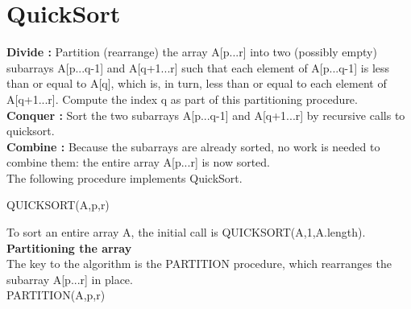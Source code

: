 \section{QuickSort}
\textbf{Divide :} Partition (rearrange) the array A[p...r] into two (possibly empty) subarrays A[p...q-1] and 
A[q+1...r] such that each element of A[p...q-1] is less than or equal to A[q], which is, in turn, less than or equal to each element of A[q+1...r]. Compute the index q as part of this partitioning procedure.
\\[0.5em]
\textbf{Conquer :} Sort the two subarrays A[p...q-1] and A[q+1...r] by recursive calls to quicksort.
\\[0.5em]
\textbf{Combine :} Because the subarrays are already sorted, no work is needed to combine them: the entire array A[p...r] is now sorted.
\\[0.5em]
The following procedure implements QuickSort.
\begin{algorithm}
QUICKSORT(A,p,r)
\begin{algorithmic}
 	\ENDIF
\end{algorithmic}
To sort an entire array A, the initial call is QUICKSORT(A,1,A.length).\\[0.5em]
\textbf{Partitioning the array}\\[0.5em]
The key to the algorithm is the PARTITION procedure, which rearranges the subarray A[p...r] in place.\\[1em]
PARTITION(A,p,r)
\begin{algorithmic}
		\ENDIF
	\ENDFOR
 \end{algorithmic}
\end{algorithm}
\cite{hoare1962quicksort}